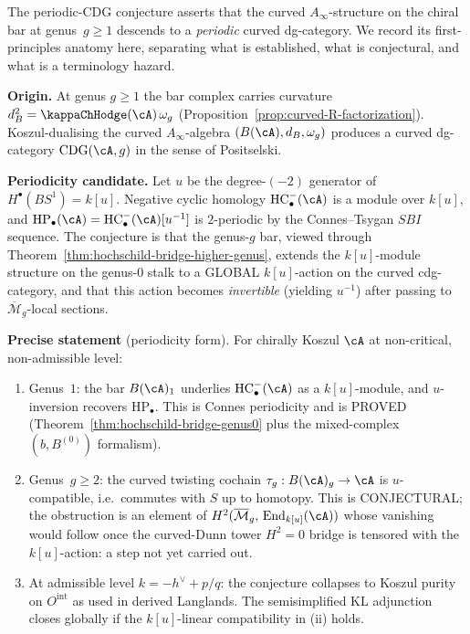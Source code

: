 \begin{remark}
\label{rem:periodic-cdg-mechanism}
The periodic-CDG conjecture asserts that the curved
$A_\infty$-structure on the chiral bar at genus~$g \geq 1$
descends to a \emph{periodic} curved dg-category. We record its
first-principles anatomy here, separating what is established,
what is conjectural, and what is a terminology hazard.

\medskip
\noindent\textbf{Origin.} At genus $g \geq 1$ the bar complex
carries curvature
$d_B^2 = \kappaChHodge(\cA)\,\omega_g$
(Proposition~\ref{prop:curved-R-factorization}). Koszul-dualising
the curved $A_\infty$-algebra $(B(\cA), d_B, \omega_g)$ produces a
curved dg-category $\mathrm{CDG}(\cA, g)$ in the sense of
Positselski.

\medskip
\noindent\textbf{Periodicity candidate.} Let $u$ be the
degree-$(-2)$ generator of $H^\bullet(BS^1) = k[u]$. Negative
cyclic homology $\mathrm{HC}^-_\bullet(\cA)$ is a module over
$k[u]$, and
$\mathrm{HP}_\bullet(\cA) =
\mathrm{HC}^-_\bullet(\cA)[u^{-1}]$ is $2$-periodic by the
Connes--Tsygan $SBI$ sequence. The conjecture is that the
genus-$g$ bar, viewed through
Theorem~\ref{thm:hochschild-bridge-higher-genus}, extends the
$k[u]$-module structure on the genus-$0$ stalk to a GLOBAL
$k[u]$-action on the curved cdg-category, and that this action
becomes \emph{invertible} (yielding $u^{-1}$) after passing to
$\overline{\mathcal{M}}_g$-local sections.

\medskip
\noindent\textbf{Precise statement} (periodicity form). For
chirally Koszul $\cA$ at non-critical, non-admissible level:
\begin{enumerate}[label=\textup{(\roman*)}]
\item Genus~$1$: the bar $B(\cA)_1$ underlies
$\mathrm{HC}^-_\bullet(\cA)$ as a $k[u]$-module, and
$u$-inversion recovers $\mathrm{HP}_\bullet$. This is
Connes periodicity and is PROVED
(Theorem~\ref{thm:hochschild-bridge-genus0} plus the
mixed-complex $(b, B^{(0)})$ formalism).
\item Genus~$g \geq 2$: the curved twisting cochain
$\tau_g : B(\cA)_g \to \cA$ is $u$-compatible,
i.e.\ commutes with $S$ up to homotopy. This is CONJECTURAL;
the obstruction is an element of
$H^2(\overline{\mathcal{M}}_g,\, \mathrm{End}_{k[u]}(\cA))$
whose vanishing would follow once the curved-Dunn tower
$H^2 = 0$ bridge is tensored with the $k[u]$-action: a step
not yet carried out.
\item At admissible level $k = -h^\vee + p/q$: the conjecture
collapses to Koszul purity on \(O^{\mathrm{int}}\) as used in
derived Langlands. The semisimplified KL adjunction closes globally if
the \(k[u]\)-linear compatibility in (ii) holds.
\end{enumerate}


\end{remark}
